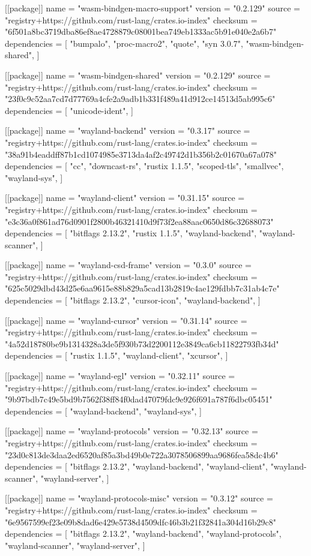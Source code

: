 [[package]]
name = "wasm-bindgen-macro-support"
version = "0.2.129"
source = "registry+https://github.com/rust-lang/crates.io-index"
checksum = "6f501a8bc3719dba86ef8ae4728879c08001bea749eb1333ac5b91e040e2a6b7"
dependencies = [
 "bumpalo",
 "proc-macro2",
 "quote",
 "syn 3.0.7",
 "wasm-bindgen-shared",
]

[[package]]
name = "wasm-bindgen-shared"
version = "0.2.129"
source = "registry+https://github.com/rust-lang/crates.io-index"
checksum = "23f0c9c52aa7cd7d77769a4cfe2a9adb1b331f489a41d912ce14513d5ab995c6"
dependencies = [
 "unicode-ident",
]

[[package]]
name = "wayland-backend"
version = "0.3.17"
source = "registry+https://github.com/rust-lang/crates.io-index"
checksum = "38a91b4eaddff87b1cd1074985e3713da4af2c49742d1b356b2c01670a67a078"
dependencies = [
 "cc",
 "downcast-rs",
 "rustix 1.1.5",
 "scoped-tls",
 "smallvec",
 "wayland-sys",
]

[[package]]
name = "wayland-client"
version = "0.31.15"
source = "registry+https://github.com/rust-lang/crates.io-index"
checksum = "e3c36a0f861ad76d0901f2800b46321410d9f73f2ea88aac0650d86c32688073"
dependencies = [
 "bitflags 2.13.2",
 "rustix 1.1.5",
 "wayland-backend",
 "wayland-scanner",
]

[[package]]
name = "wayland-csd-frame"
version = "0.3.0"
source = "registry+https://github.com/rust-lang/crates.io-index"
checksum = "625c5029dbd43d25e6aa9615e88b829a5cad13b2819c4ae129fdbb7c31ab4c7e"
dependencies = [
 "bitflags 2.13.2",
 "cursor-icon",
 "wayland-backend",
]

[[package]]
name = "wayland-cursor"
version = "0.31.14"
source = "registry+https://github.com/rust-lang/crates.io-index"
checksum = "4a52d18780be9b1314328a3de5f930b73d2200112e3849ca6cb11822793fb34d"
dependencies = [
 "rustix 1.1.5",
 "wayland-client",
 "xcursor",
]

[[package]]
name = "wayland-egl"
version = "0.32.11"
source = "registry+https://github.com/rust-lang/crates.io-index"
checksum = "9b97bdb7c49e5bd9b7562f38ff84f0dad47079fdc9e926f691a787f6dbc05451"
dependencies = [
 "wayland-backend",
 "wayland-sys",
]

[[package]]
name = "wayland-protocols"
version = "0.32.13"
source = "registry+https://github.com/rust-lang/crates.io-index"
checksum = "23d0c813de3daa2ed6520af85a3bd49b0e722a3078506899aa9686fea58dc4b6"
dependencies = [
 "bitflags 2.13.2",
 "wayland-backend",
 "wayland-client",
 "wayland-scanner",
 "wayland-server",
]

[[package]]
name = "wayland-protocols-misc"
version = "0.3.12"
source = "registry+https://github.com/rust-lang/crates.io-index"
checksum = "6e9567599ef23e09b8dad6e429e5738d4509dfc46b3b21f32841a304d16b29c8"
dependencies = [
 "bitflags 2.13.2",
 "wayland-backend",
 "wayland-protocols",
 "wayland-scanner",
 "wayland-server",
]

